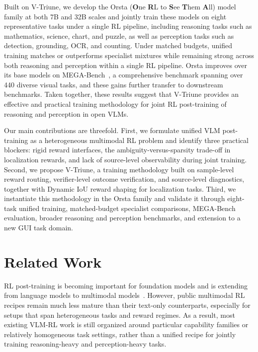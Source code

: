 Built on V-Triune, we develop the Orsta (\textbf{O}ne \textbf{R}L to \textbf{S}ee \textbf{T}hem \textbf{A}ll) model family at both 7B and 32B scales and jointly train these models on eight representative tasks under a single RL pipeline, including reasoning tasks such as mathematics, science, chart, and puzzle, as well as perception tasks such as detection, grounding, OCR, and counting.
%
Under matched budgets, unified training matches or outperforms specialist mixtures while remaining strong across both reasoning and perception within a single RL pipeline.
%
Orsta improves over its base models on MEGA-Bench~\citep{chen2024mega}, a comprehensive benchmark spanning over 440 diverse visual tasks, and these gains further transfer to downstream benchmarks.
%
Taken together, these results suggest that V-Triune provides an effective and practical training methodology for joint RL post-training of reasoning and perception in open VLMs.

Our main contributions are threefold.
%
First, we formulate unified VLM post-training as a heterogeneous multimodal RL problem and identify three practical blockers: rigid reward interfaces, the ambiguity-versus-sparsity trade-off in localization rewards, and lack of source-level observability during joint training.
%
Second, we propose V-Triune, a training methodology built on sample-level reward routing, verifier-level outcome verification, and source-level diagnostics, together with Dynamic IoU reward shaping for localization tasks.
%
Third, we instantiate this methodology in the Orsta family and validate it through eight-task unified training, matched-budget specialist comparisons, MEGA-Bench evaluation, broader reasoning and perception benchmarks, and extension to a new GUI task domain.

\section{Related Work}

RL post-training is becoming important for foundation models and is extending from language models to multimodal models~\citep{liu2025deepseek,qwen3.5,team2026kimi,team2025longcat,xiao2026mimo}.
%
However, public multimodal RL recipes remain much less mature than their text-only counterparts, especially for setups that span heterogeneous tasks and reward regimes.
%
As a result, most existing VLM-RL work is still organized around particular capability families or relatively homogeneous task settings, rather than a unified recipe for jointly training reasoning-heavy and perception-heavy tasks.

